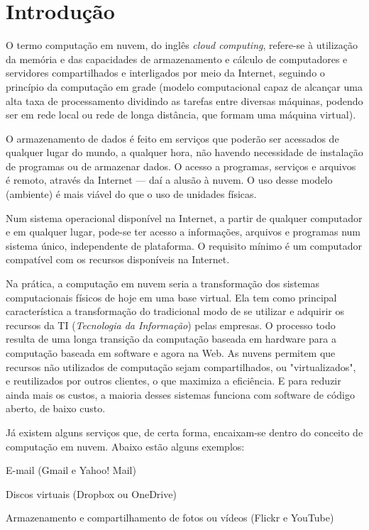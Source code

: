 \section{Introdução}

O termo computação em nuvem, do inglês \emph{cloud computing}, refere-se à
utilização da memória e das capacidades de armazenamento e cálculo de
computadores e servidores compartilhados e interligados por meio da Internet,
seguindo o princípio da computação em grade (modelo computacional capaz de
alcançar uma alta taxa de processamento dividindo as tarefas entre diversas
máquinas, podendo ser em rede local ou rede de longa distância, que formam uma
máquina virtual).

O armazenamento de dados é feito em serviços que poderão ser acessados de qualquer
lugar do mundo, a qualquer hora, não havendo necessidade de instalação de
programas ou de armazenar dados. O acesso a programas, serviços e arquivos é
remoto, através da Internet --- daí a alusão à nuvem. O uso desse modelo (ambiente)
é mais viável do que o uso de unidades físicas.

Num sistema operacional disponível na Internet, a partir de qualquer computador e em
qualquer lugar, pode-se ter acesso a informações, arquivos e programas num sistema
único, independente de plataforma. O requisito mínimo é um computador compatível
com os recursos disponíveis na Internet.

Na prática, a computação em nuvem seria a transformação dos sistemas
computacionais físicos de hoje em uma base virtual. Ela tem como principal
característica a transformação do tradicional modo de se utilizar e adquirir os
recursos da TI (\emph{Tecnologia da Informação}) pelas empresas. O processo todo
resulta de uma longa transição da computação baseada em hardware para a computação
baseada em software e agora na Web. As nuvens permitem que recursos não utilizados
de computação sejam compartilhados, ou "virtualizados", e reutilizados por outros
clientes, o que maximiza a eficiência. E para reduzir ainda mais os custos, a maioria
desses sistemas funciona com software de código aberto, de baixo custo.

Já existem alguns serviços que, de certa forma, encaixam-se dentro do
conceito de computação em nuvem. Abaixo estão alguns exemplos:

\begin{itemise}
    \item E-mail (Gmail e Yahoo! Mail)

    \item Discos virtuais (Dropbox ou OneDrive)

    \item Armazenamento e compartilhamento de fotos ou vídeos (Flickr e YouTube)
\end{itemise}

